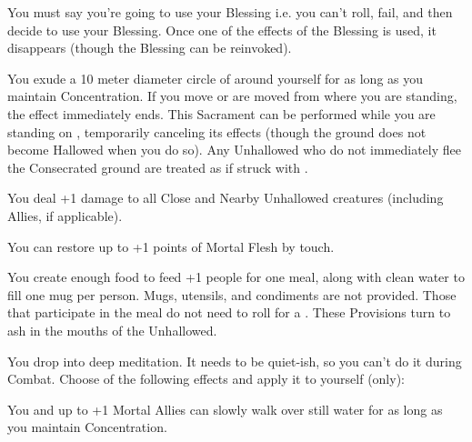     You must say you're going to use your Blessing  i.e. you can't roll, fail, and then decide to use your Blessing.  Once one of the effects of the Blessing is used, it disappears (though the Blessing can be reinvoked).

\newpage


    You exude a 10 meter diameter circle of  around yourself for as long as you maintain Concentration. If you move or are moved from where you are standing, the effect immediately ends. This Sacrament can be performed while you are standing on , temporarily canceling its effects (though the ground does not become Hallowed when you do so). Any Unhallowed who do not immediately flee the Consecrated ground are treated as if struck with .



   You deal \SUMDICE+1 damage to all Close and Nearby Unhallowed creatures (including Allies, if applicable).



    You can restore up to \SUMDICE+1 points of Mortal Flesh by touch.

\cbreak


    You create enough food to feed \SUMDICE+1 people for one meal, along with clean water to fill one mug per person. Mugs, utensils, and condiments are not provided.  Those that participate in the meal do not need to roll  for a . These Provisions turn to ash in the mouths of the Unhallowed. 


    You drop into deep meditation. It needs to be quiet-ish, so you can't do it during Combat. Choose of the following effects and apply it to yourself (only):




   You and up to \SUMDICE+1 Mortal Allies can slowly walk over still water for as long as you maintain Concentration.

